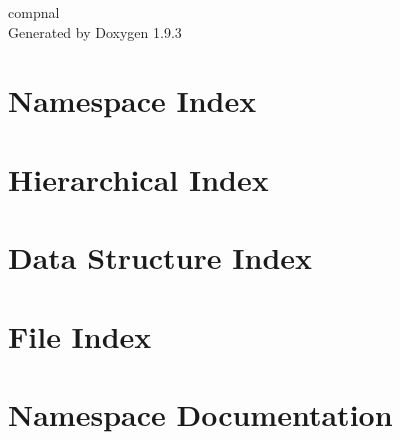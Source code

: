\documentclass[twoside]{book}
\newcommand{\+}{\discretionary{\mbox{\scriptsize$\hookleftarrow$}}{}{}}
\newcommand{\clearemptydoublepage}{%
    \newpage{\pagestyle{empty}\cleardoublepage}%
  }
\begin{document}
  \raggedbottom
    \hypersetup{pageanchor=false,
                bookmarksnumbered=true,
                pdfencoding=unicode
               }
  \begin{titlepage}
  \vspace*{7cm}
  \begin{center}%
  {\Large compnal}\\
  \vspace*{1cm}
  {\large Generated by Doxygen 1.9.3}\\
  \end{center}
  \end{titlepage}
  \clearemptydoublepage
  \tableofcontents
  \clearemptydoublepage
  \hypersetup{pageanchor=true}
\chapter{Namespace Index}

\chapter{Hierarchical Index}

\chapter{Data Structure Index}

\chapter{File Index}

\chapter{Namespace Documentation}






\end{document}
